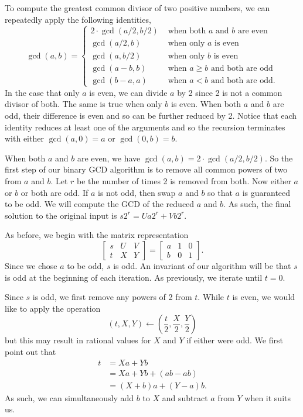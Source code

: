 \documentclass{ucalgthes1}
\theoremstyle{definition}
\newcommand{\matrixThreeTwo}[6]{\left[ \begin{array}{rrr} #1 & #2 & #3 \\ #4 & #5 & #6 \end{array} \right]}
\begin{document}
To compute the greatest common divisor of two positive numbers, we can repeatedly apply the following identities,
\[
	\gcd(a, b) = \begin{cases}
		2 \cdot \gcd(a/2, b/2) & \textrm{ when both $a$ and $b$ are even} \\
		\gcd(a/2, b) & \textrm{ when only $a$ is even} \\
		\gcd(a, b/2) & \textrm{ when only $b$ is even} \\
		\gcd(a-b, b) & \textrm{ when $a \ge b$ and both are odd} \\
		\gcd(b-a, a) & \textrm{ when $a < b$ and both are odd}.
	\end{cases}
\]
In the case that only $a$ is even, we can divide $a$ by 2 since 2 is not a common divisor of both.  The same is true when only $b$ is even.  When both $a$ and $b$ are odd, their difference is even and so can be further reduced by 2.  Notice that each identity reduces at least one of the arguments and so the recursion terminates with either $\gcd(a, 0) = a$ or $\gcd(0, b) = b$.

When both $a$ and $b$ are even, we have $\gcd(a, b) = 2 \cdot \gcd(a/2, b/2)$.  So the first step of our binary GCD algorithm is to remove all common powers of two from $a$ and $b$.  Let $r$ be the number of times 2 is removed from both.  Now either $a$ or $b$ or both are odd.  If $a$ is not odd, then swap $a$ and $b$ so that $a$ is guaranteed to be odd.  We will compute the GCD of the reduced $a$ and $b$.  As such, the final solution to the original input is $s2^r = Ua2^r + Vb2^r$.

As before, we begin with the matrix representation
\[
	\matrixThreeTwo{s}{U}{V}{t}{X}{Y} = \matrixThreeTwo{a}{1}{0}{b}{0}{1}.
\]
Since we chose $a$ to be odd, $s$ is odd.  An invariant of our algorithm will be that $s$ is odd at the beginning of each iteration.  As previously, we iterate until $t=0$.

Since $s$ is odd, we first remove any powers of 2 from $t$.  While $t$ is even, we would like to apply the operation
\[
(t, X, Y) \gets \left( \frac{t}{2}, \frac{X}{2}, \frac{Y}{2} \right)
\]
but this may result in rational values for $X$ and $Y$ if either were odd. We first point out that
\begin{align*}
	t &= Xa + Yb \\
	  &= Xa + Yb + (ab - ab) \\
	  &= (X+b)a + (Y-a)b.
\end{align*}
As such, we can simultaneously add $b$ to $X$ and subtract $a$ from $Y$ when it suits us.
\end{document}
